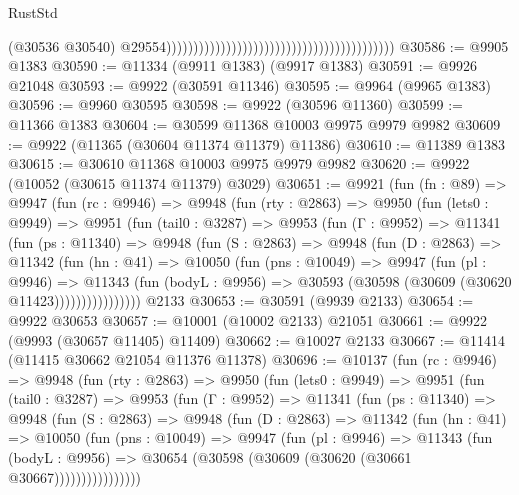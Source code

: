 \begin{lexlean}{RustStd}
\begin{coremodule}
                                                                                        (@30536
                                                                                          @30540)
                                                                                        @29554))))))))))))))))))))))))))))))))))))))))))
@30586 := @9905 @1383
@30590 := @11334 (@9911 @1383) (@9917 @1383)
@30591 := @9926 @21048
@30593 := @9922 (@30591 @11346)
@30595 := @9964 (@9965 @1383)
@30596 := @9960 @30595
@30598 := @9922 (@30596 @11360)
@30599 := @11366 @1383
@30604 := @30599 @11368 @10003 @9975 @9979 @9982
@30609 := @9922 (@11365 (@30604 @11374 @11379) @11386)
@30610 := @11389 @1383
@30615 := @30610 @11368 @10003 @9975 @9979 @9982
@30620 := @9922 (@10052 (@30615 @11374 @11379) @3029)
@30651 := @9921
    (fun (fn : @89) =>
    @9947
      (fun (rc : @9946) =>
      @9948
        (fun (rty : @2863) =>
        @9950
          (fun (lets0 : @9949) =>
          @9951
            (fun (tail0 : @3287) =>
            @9953
              (fun (Γ : @9952) =>
              @11341
                (fun (ps : @11340) =>
                @9948
                  (fun (S : @2863) =>
                  @9948
                    (fun (D : @2863) =>
                    @11342
                      (fun (hn : @41) =>
                      @10050
                        (fun (pns : @10049) =>
                        @9947
                          (fun (pl : @9946) =>
                          @11343
                            (fun (bodyL : @9956) =>
                            @30593 (@30598 (@30609 (@30620 @11423))))))))))))))))
    @2133
@30653 := @30591 (@9939 @2133)
@30654 := @9922 @30653
@30657 := @10001 (@10002 @2133) @21051
@30661 := @9922 (@9993 (@30657 @11405) @11409)
@30662 := @10027 @2133
@30667 := @11414 (@11415 @30662 @21054 @11376 @11378)
@30696 := @10137
    (fun (rc : @9946) =>
    @9948
      (fun (rty : @2863) =>
      @9950
        (fun (lets0 : @9949) =>
        @9951
          (fun (tail0 : @3287) =>
          @9953
            (fun (Γ : @9952) =>
            @11341
              (fun (ps : @11340) =>
              @9948
                (fun (S : @2863) =>
                @9948
                  (fun (D : @2863) =>
                  @11342
                    (fun (hn : @41) =>
                    @10050
                      (fun (pns : @10049) =>
                      @9947
                        (fun (pl : @9946) =>
                        @11343
                          (fun (bodyL : @9956) =>
                          @30654 (@30598 (@30609 (@30620 (@30661 @30667))))))))))))))))

\end{coremodule}
\end{lexlean}
